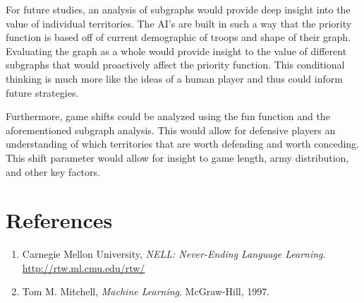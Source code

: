 \documentclass[12pt]{article}  %
\begin{document}
For future studies, an analysis of subgraphs would provide deep insight into the value of individual territories. The AI’s are built in such a way that the priority function is based off of current demographic of troops and shape of their graph. Evaluating the graph as a whole would provide insight to the value of different subgraphs that would proactively affect the priority function. This conditional thinking is much more like the ideas of a human player and thus could inform future strategies. 

Furthermore, game shifts could be analyzed using the fun function and the aforementioned subgraph analysis. This would allow for defensive players an understanding of which territories that are worth defending and worth conceding. This shift parameter would allow for insight to game length, army distribution, and other key factors.  





\section{References}


\begin{enumerate}

\item Carnegie Mellon University, \emph{NELL: Never-Ending Language Learning}. \url{http://rtw.ml.cmu.edu/rtw/}\label{NELL}

\item Tom M. Mitchell, \emph{Machine Learning}. McGraw-Hill, 1997.\label{Mitchell}
\end{enumerate}
\end{document}
